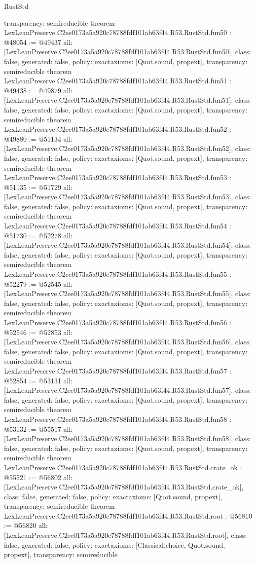 \begin{lexlean}{RustStd}
\begin{coremodule}
{  transparency: semireducible
}
theorem LexLeanPreserve.C2ee0173a5a920c78788fdf101ab63f44.R53.RustStd.fun50 : @48054 := @49437 {
  all: [LexLeanPreserve.C2ee0173a5a920c78788fdf101ab63f44.R53.RustStd.fun50],
  class: false,
  generated: false,
  policy: exact{axioms: [Quot.sound, propext]},
  transparency: semireducible
}
theorem LexLeanPreserve.C2ee0173a5a920c78788fdf101ab63f44.R53.RustStd.fun51 : @49438 := @49879 {
  all: [LexLeanPreserve.C2ee0173a5a920c78788fdf101ab63f44.R53.RustStd.fun51],
  class: false,
  generated: false,
  policy: exact{axioms: [Quot.sound, propext]},
  transparency: semireducible
}
theorem LexLeanPreserve.C2ee0173a5a920c78788fdf101ab63f44.R53.RustStd.fun52 : @49880 := @51134 {
  all: [LexLeanPreserve.C2ee0173a5a920c78788fdf101ab63f44.R53.RustStd.fun52],
  class: false,
  generated: false,
  policy: exact{axioms: [Quot.sound, propext]},
  transparency: semireducible
}
theorem LexLeanPreserve.C2ee0173a5a920c78788fdf101ab63f44.R53.RustStd.fun53 : @51135 := @51729 {
  all: [LexLeanPreserve.C2ee0173a5a920c78788fdf101ab63f44.R53.RustStd.fun53],
  class: false,
  generated: false,
  policy: exact{axioms: [Quot.sound, propext]},
  transparency: semireducible
}
theorem LexLeanPreserve.C2ee0173a5a920c78788fdf101ab63f44.R53.RustStd.fun54 : @51730 := @52278 {
  all: [LexLeanPreserve.C2ee0173a5a920c78788fdf101ab63f44.R53.RustStd.fun54],
  class: false,
  generated: false,
  policy: exact{axioms: [Quot.sound, propext]},
  transparency: semireducible
}
theorem LexLeanPreserve.C2ee0173a5a920c78788fdf101ab63f44.R53.RustStd.fun55 : @52279 := @52545 {
  all: [LexLeanPreserve.C2ee0173a5a920c78788fdf101ab63f44.R53.RustStd.fun55],
  class: false,
  generated: false,
  policy: exact{axioms: [Quot.sound, propext]},
  transparency: semireducible
}
theorem LexLeanPreserve.C2ee0173a5a920c78788fdf101ab63f44.R53.RustStd.fun56 : @52546 := @52853 {
  all: [LexLeanPreserve.C2ee0173a5a920c78788fdf101ab63f44.R53.RustStd.fun56],
  class: false,
  generated: false,
  policy: exact{axioms: [Quot.sound, propext]},
  transparency: semireducible
}
theorem LexLeanPreserve.C2ee0173a5a920c78788fdf101ab63f44.R53.RustStd.fun57 : @52854 := @53131 {
  all: [LexLeanPreserve.C2ee0173a5a920c78788fdf101ab63f44.R53.RustStd.fun57],
  class: false,
  generated: false,
  policy: exact{axioms: [Quot.sound, propext]},
  transparency: semireducible
}
theorem LexLeanPreserve.C2ee0173a5a920c78788fdf101ab63f44.R53.RustStd.fun58 : @53132 := @55517 {
  all: [LexLeanPreserve.C2ee0173a5a920c78788fdf101ab63f44.R53.RustStd.fun58],
  class: false,
  generated: false,
  policy: exact{axioms: [Quot.sound, propext]},
  transparency: semireducible
}
theorem LexLeanPreserve.C2ee0173a5a920c78788fdf101ab63f44.R53.RustStd.crate_ok : @55521 := @56802 {
  all: [LexLeanPreserve.C2ee0173a5a920c78788fdf101ab63f44.R53.RustStd.crate_ok],
  class: false,
  generated: false,
  policy: exact{axioms: [Quot.sound, propext]},
  transparency: semireducible
}
theorem LexLeanPreserve.C2ee0173a5a920c78788fdf101ab63f44.R53.RustStd.root : @56810 := @56820 {
  all: [LexLeanPreserve.C2ee0173a5a920c78788fdf101ab63f44.R53.RustStd.root],
  class: false,
  generated: false,
  policy: exact{axioms: [Classical.choice, Quot.sound, propext]},
  transparency: semireducible
}


\end{coremodule}
\end{lexlean}
